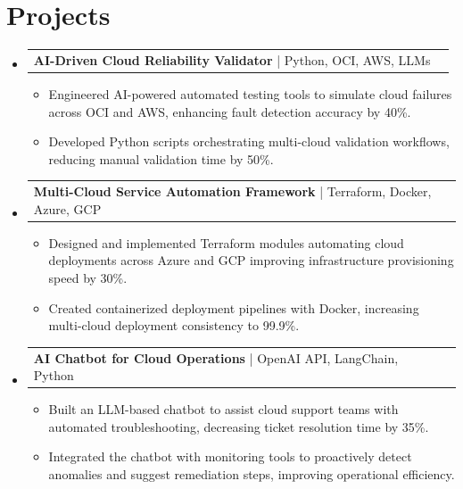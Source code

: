 \documentclass[letterpaper,11pt]{article}
\makeatletter
\newcommand{\resumeItem}[1]{
  \item\footnotesize{
    {#1 \vspace{-2pt}}
  }
}
\newcommand{\resumeProjectHeading}[2]{
    \item
    \begin{tabular*}{1.001\textwidth}{l@{\extracolsep{\fill}}r}
      \small#1 & \textbf{\small #2}\\
    \end{tabular*}\vspace{-7pt}
}
\newcommand{\resumeSubHeadingListStart}{\begin{itemize}[leftmargin=0pt, label={}]}
\newcommand{\resumeSubHeadingListEnd}{\end{itemize}}
\newcommand{\resumeItemListStart}{\begin{itemize}[leftmargin=*]}
\newcommand{\resumeItemListEnd}{\end{itemize}\vspace{-5pt}}
\makeatother
\begin{document}
\section{Projects}
    \vspace{-5pt}
    \resumeSubHeadingListStart
      \resumeProjectHeading
          {\textbf{AI-Driven Cloud Reliability Validator} | Python, OCI, AWS, LLMs}{}
          \resumeItemListStart
              \resumeItem{Engineered AI-powered automated testing tools to simulate cloud failures across OCI and AWS, enhancing fault detection accuracy by 40\%.}
              \resumeItem{Developed Python scripts orchestrating multi-cloud validation workflows, reducing manual validation time by 50\%.}
          \resumeItemListEnd
          \vspace{-12pt}
      \resumeProjectHeading
          {\textbf{Multi-Cloud Service Automation Framework} | Terraform, Docker, Azure, GCP}{}
          \resumeItemListStart
              \resumeItem{Designed and implemented Terraform modules automating cloud deployments across Azure and GCP improving infrastructure provisioning speed by 30\%.}
              \resumeItem{Created containerized deployment pipelines with Docker, increasing multi-cloud deployment consistency to 99.9\%.}
          \resumeItemListEnd
          \vspace{-12pt}
      \resumeProjectHeading
          {\textbf{AI Chatbot for Cloud Operations} | OpenAI API, LangChain, Python}{}
          \resumeItemListStart
              \resumeItem{Built an LLM-based chatbot to assist cloud support teams with automated troubleshooting, decreasing ticket resolution time by 35\%.}
              \resumeItem{Integrated the chatbot with monitoring tools to proactively detect anomalies and suggest remediation steps, improving operational efficiency.}
          \resumeItemListEnd 
    \resumeSubHeadingListEnd
\end{document}
